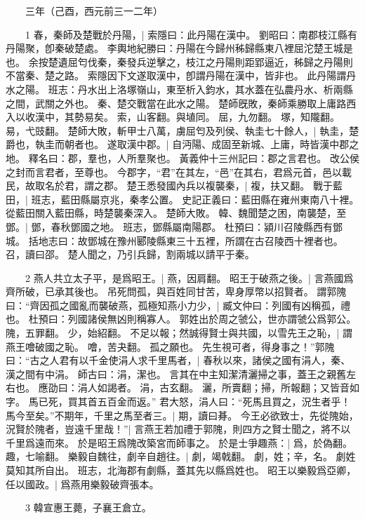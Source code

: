 　　三年（己酉，西元前三一二年）

　　1 春，秦師及楚戰於丹陽，|{
	索隱曰：此丹陽在漢中。
	劉昭曰：南郡枝江縣有丹陽聚，卽秦破楚處。
	李輿地紀勝曰：丹陽在今歸州秭歸縣東八裡屈沱楚王城是也。
	余按楚遺屈匄伐秦，秦發兵逆擊之，枝江之丹陽則距郢逼近，秭歸之丹陽則不當秦、楚之路。
	索隱因下文遂取漢中，卽謂丹陽在漢中，皆非也。
	此丹陽謂丹水之陽。
	班志：丹水出上洛塚嶺山，東至析入鈞水，其水蓋在弘農丹水、析兩縣之間，武關之外也。
	秦、楚交戰當在此水之陽。
	楚師旣敗，秦師乘勝取上庸路西入以收漢中，其勢易矣。
	索，山客翻。與埴同。
	屈，九勿翻。
	塚，知隴翻。
	易，弋豉翻。
}
楚師大敗，斬甲士八萬，虜屈匄及列侯、執圭七十餘人，|{
	執圭，楚爵也，執圭而朝者也。
}
遂取漢中郡。|{
	自沔陽、成固至新城、上庸，時皆漢中郡之地。
	釋名曰：郡，羣也，人所羣聚也。
	黃義仲十三州記曰：郡之言君也。
	改公侯之封而言君者，至尊也。
	今郡字，“君”在其左，“邑”在其右，君爲元首，邑以載民，故取名於君，謂之郡。
}
楚王悉發國內兵以複襲秦，|{
	複，扶又翻。
}
戰于藍田，|{
	班志，藍田縣屬京兆，秦孝公置。
	史記正義曰：藍田縣在雍州東南八十裡。
	從藍田關入藍田縣，時楚襲秦深入。
}
楚師大敗。
	韓、魏聞楚之困，南襲楚，至鄧。|{
	鄧，春秋鄧國之地。
	班志，鄧縣屬南陽郡。
	杜預曰：潁川召陵縣西有鄧城。
	括地志曰：故鄧城在豫州郾陵縣東三十五裡，所謂在古召陵西十裡者也。
	召，讀曰邵。
}
楚人聞之，乃引兵歸，割兩城以請平于秦。


　　2 燕人共立太子平，是爲昭王。|{
	燕，因肩翻。
}
昭王于破燕之後。|{
	言燕國爲齊所破，已承其後也。
}
吊死問孤，與百姓同甘苦，卑身厚幣以招賢者。
	謂郭隗曰：“齊因孤之國亂而襲破燕，孤極知燕小力少，|{
	臧文仲曰：列國有凶稱孤，禮也。
	杜預曰：列國諸侯無凶則稱寡人。
	郭姓出於周之虢公，世亦謂虢公爲郭公。
	隗，五罪翻。
	少，始紹翻。
}
不足以報；然誠得賢士與共國，以雪先王之恥，|{
	謂燕王噲破國之恥。
	噲，苦夬翻。
}
孤之願也。
	先生視可者，得身事之！”郭隗曰：“古之人君有以千金使涓人求千里馬者，|{
	春秋以來，諸侯之國有涓人，秦、漢之間有中涓。
	師古曰：涓，潔也。
	言其在中主知潔清灑掃之事，蓋王之親舊左右也。
	應劭曰：涓人如謁者。
	涓，古玄翻。
	灑，所賣翻；掃，所報翻；又皆音如字。
}
馬已死，買其首五百金而返。”
	君大怒，涓人曰：“死馬且買之，況生者乎！馬今至矣。”不期年，千里之馬至者三。|{
	期，讀曰朞。
}
今王必欲致士，先從隗始，況賢於隗者，豈遠千里哉！”|{
	言燕王若加禮于郭隗，則四方之賢士聞之，將不以千里爲遠而來。
}
於是昭王爲隗改築宮而師事之。
	於是士爭趣燕：|{
	爲，於偽翻。
	趣，七喻翻。
}
樂毅自魏往，劇辛自趙往。|{
	劇，竭戟翻。
	劇，姓；辛，名。
	劇姓莫知其所自出。
	班志，北海郡有劇縣，蓋其先以縣爲姓也。
}
昭王以樂毅爲亞卿，任以國政。|{
	爲燕用樂毅破齊張本。
}

　　3 韓宣惠王薨，子襄王倉立。


